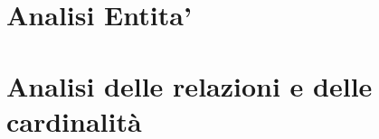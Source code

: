 \section{Analisi Entita'}\label{analisi_entita}
    
    
\section{Analisi delle relazioni e delle cardinalità}
	